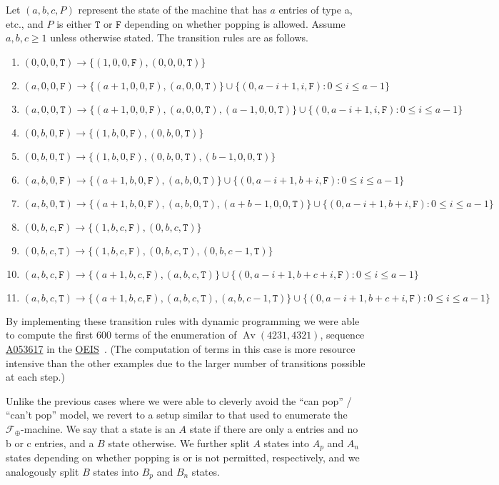 \documentclass[10pt]{article}
\newcommand{\false}{\texttt{F}}
\newcommand{\true}{\texttt{T}}
\theoremstyle{plain}
\theoremstyle{definition}
\newcommand{\Av}{\operatorname{Av}}
\newcommand{\F}{\mathcal{F}}
\newcommand{\OEISlink}[1]{\href{http://oeis.org/#1}{#1}}
\newcommand{\OEISref}{\href{http://oeis.org/}{OEIS}~\cite{sloane:the-on-line-enc:}}
\newcommand{\OEIS}[1]{sequence \OEISlink{#1} in the \OEISref}
\begin{document}
Let $(a,b,c,P)$ represent the state of the machine that has $a$ entries of type \textsf{a}, etc., and $P$ is either $\true$ or $\false$ depending on whether popping is allowed. Assume $a,b,c \geq 1$ unless otherwise stated. The transition rules are as follows.
\begin{enumerate}
	\item $(0,0,0,\true) \longrightarrow \{(1,0,0,\false), (0,0,0,\true)\}$
	\item $(a,0,0,\false) \longrightarrow \{(a+1,0,0,\false), (a, 0,0,\true)\} \cup \{(0,a-i+1,i,\false) : 0 \leq i \leq a-1\}$
	\item $(a,0,0,\true) \longrightarrow \{(a+1,0,0,\false), (a, 0,0,\true), (a-1,0,0,\true)\} \cup \{(0,a-i+1,i,\false) : 0 \leq i \leq a-1\}$
	\item $(0, b, 0, \false) \longrightarrow \{(1, b, 0, \false), (0, b, 0, \true)\}$
	\item $(0, b, 0, \true) \longrightarrow \{(1, b, 0, \false), (0, b, 0, \true), (b-1, 0, 0, \true)\}$
	\item $(a, b, 0, \false) \longrightarrow \{(a+1, b, 0, \false), (a, b, 0, \true)\} \cup \{(0, a-i+1,b+i,\false) : 0 \leq i \leq a-1\}$
	\item $(a, b, 0, \true) \longrightarrow \{(a+1, b, 0, \false), (a, b, 0, \true), (a+b-1, 0, 0, \true)\} \cup \{(0, a-i+1,b+i,\false) : 0 \leq i \leq a-1\}$
	\item $(0, b, c, \false) \longrightarrow \{(1, b, c, \false), (0, b, c, \true)\}$
	\item $(0, b, c, \true) \longrightarrow \{(1, b, c, \false), (0, b, c, \true), (0, b, c-1, \true)\}$
	\item $(a,b,c,\false) \longrightarrow \{(a+1, b, c, \false), (a, b, c, \true)\} \cup \{(0, a-i+1,b+c+i, \false) : 0 \leq i \leq a-1\}$
	\item $(a,b,c,\true) \longrightarrow \{(a+1, b, c, \false), (a, b, c, \true), (a, b, c-1, \true)\} \cup \{(0, a-i+1,b+c+i, \false) : 0 \leq i \leq a-1\}$
\end{enumerate}
		
By implementing these transition rules with dynamic programming we were able to compute the first 600 terms of the enumeration of $\Av(4231,4321)$, \OEIS{A053617}. (The computation of terms in this case is more resource intensive than the other examples due to the larger number of transitions possible at each step.)

Unlike the previous cases where we were able to cleverly avoid the ``can pop'' / ``can't pop'' model, we revert to a setup similar to that used to enumerate the $\F_\oplus$-machine. We say that a state is an $A$ state if there are only \textsf{a} entries and no \textsf{b} or \textsf{c} entries, and a $B$ state otherwise. We further split $A$ states into $A_p$ and $A_n$ states depending on whether popping is or is not permitted, respectively, and we analogously split $B$ states into $B_p$ and $B_n$ states.
\end{document}
